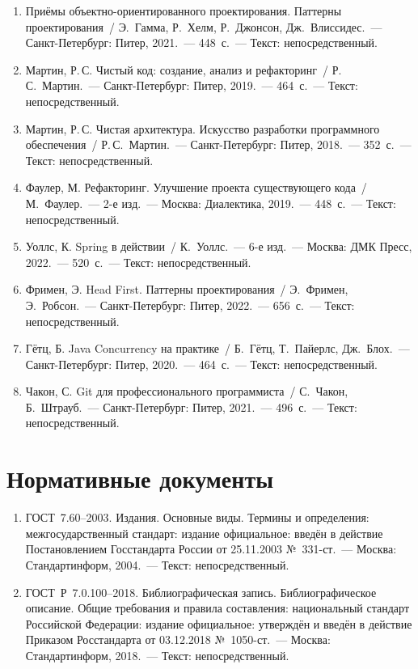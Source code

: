 \begin{enumerate}[leftmargin=*,labelsep=6pt,resume]

\item Приёмы объектно-ориентированного проектирования. Паттерны проектирования~/
Э.~Гамма, Р.~Хелм, Р.~Джонсон, Дж.~Влиссидес.~--- Санкт-Петербург: Питер,
2021.~--- 448~с.~--- Текст: непосредственный.

\item Мартин, Р.\,С. Чистый код: создание, анализ и рефакторинг~/
Р.\,С.~Мартин.~--- Санкт-Петербург: Питер, 2019.~--- 464~с.~---
Текст: непосредственный.

\item Мартин, Р.\,С. Чистая архитектура. Искусство разработки программного
обеспечения~/ Р.\,С.~Мартин.~--- Санкт-Петербург: Питер, 2018.~--- 352~с.~---
Текст: непосредственный.

\item Фаулер, М. Рефакторинг. Улучшение проекта существующего кода~/
М.~Фаулер.~--- 2-е изд.~--- Москва: Диалектика, 2019.~--- 448~с.~---
Текст: непосредственный.

\item Уоллс, К. Spring в действии~/ К.~Уоллс.~--- 6-е изд.~--- Москва: ДМК Пресс,
2022.~--- 520~с.~--- Текст: непосредственный.

\item Фримен, Э. Head First. Паттерны проектирования~/ Э.~Фримен,
Э.~Робсон.~--- Санкт-Петербург: Питер, 2022.~--- 656~с.~---
Текст: непосредственный.

\item Гётц, Б. Java Concurrency на практике~/ Б.~Гётц, Т.~Пайерлс,
Дж.~Блох.~--- Санкт-Петербург: Питер, 2020.~--- 464~с.~---
Текст: непосредственный.

\item Чакон, С. Git для профессионального программиста~/ С.~Чакон,
Б.~Штрауб.~--- Санкт-Петербург: Питер, 2021.~--- 496~с.~---
Текст: непосредственный.

\end{enumerate}

\section*{Нормативные документы}

\begin{enumerate}[leftmargin=*,labelsep=6pt,resume]

\item ГОСТ~7.60--2003. Издания. Основные виды. Термины и определения:
межгосударственный стандарт: издание официальное: введён в действие
Постановлением Госстандарта России от 25.11.2003 №~331-ст.~--- Москва:
Стандартинформ, 2004.~--- Текст: непосредственный.

\item ГОСТ~Р~7.0.100--2018. Библиографическая запись. Библиографическое
описание. Общие требования и правила составления: национальный стандарт
Российской Федерации: издание официальное: утверждён и введён в действие
Приказом Росстандарта от 03.12.2018 №~1050-ст.~--- Москва: Стандартинформ,
2018.~--- Текст: непосредственный.

\end{enumerate}

